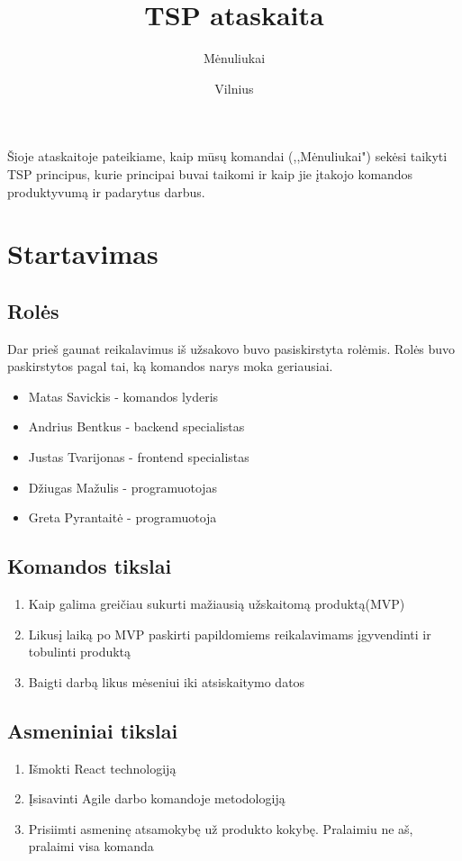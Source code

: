 \documentclass{VUMIFInfKursinis}
\title{TSP ataskaita}
\author{Mėnuliukai}
\date{Vilnius \\ \the\year}
\begin{document}
\maketitle

\tableofcontents

\begin{samepage}

Šioje ataskaitoje pateikiame, kaip mūsų komandai (,,Mėnuliukai") sekėsi taikyti TSP principus, kurie principai buvai taikomi ir kaip jie įtakojo komandos produktyvumą ir padarytus darbus.

\section{Startavimas}
	\subsection{Rolės}
		Dar prieš gaunat reikalavimus iš užsakovo buvo pasiskirstyta rolėmis. Rolės buvo paskirstytos pagal tai, ką komandos narys moka geriausiai.
		\begin{itemize}
			\item{Matas Savickis - komandos lyderis}
			\item{Andrius Bentkus - backend specialistas}
			\item{Justas Tvarijonas - frontend specialistas}
			\item{Džiugas Mažulis - programuotojas}
			\item{Greta Pyrantaitė - programuotoja}
		\end{itemize}
	\subsection{Komandos tikslai}
		\begin{enumerate}
			\item{Kaip galima greičiau sukurti mažiausią užskaitomą produktą(MVP)}
			\item{Likusį laiką po MVP paskirti papildomiems reikalavimams įgyvendinti ir tobulinti produktą}
			\item{Baigti darbą likus mėseniui iki atsiskaitymo datos}
		\end{enumerate}
	\subsection{Asmeniniai tikslai}
		\begin{enumerate}
			\item{Išmokti React technologiją}
			\item{Įsisavinti Agile darbo komandoje metodologiją}
			\item{Prisiimti asmeninę atsamokybę už produkto kokybę. Pralaimiu ne aš, pralaimi visa komanda}
		\end{enumerate}
\end{samepage}
\end{document}
